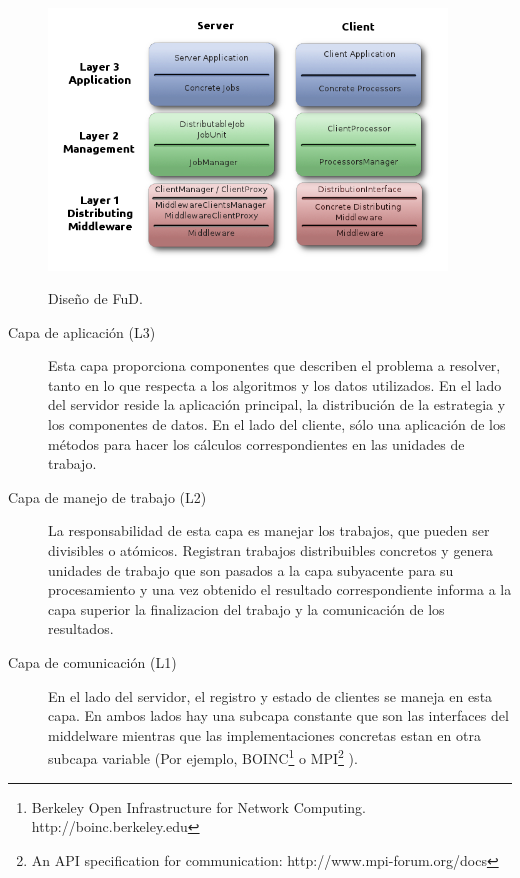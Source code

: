 \begin{figure}[!ht]
\begin{center}
\includegraphics [width=300pt]{images/FuD-AbstractLayers.png}
\label{fud_layers}
\end{center}
\caption{Diseño de FuD.}
\label{fud-layers}
\end{figure}

\begin{description}
	\item[Capa de aplicación (L3)] Esta capa proporciona componentes que describen el problema a resolver, tanto en lo que respecta a los
            algoritmos y los datos utilizados. En el lado del servidor reside la aplicación principal, la distribución de la estrategia y
            los componentes de datos. En el lado del cliente, sólo una aplicación de los métodos para hacer los cálculos correspondientes en
            las unidades de trabajo.	
	\item[Capa de manejo de trabajo (L2)] La responsabilidad de esta capa es manejar los trabajos, que pueden ser divisibles o atómicos.
            Registran trabajos distribuibles concretos y genera unidades de trabajo que son pasados a la capa subyacente para su
            procesamiento y una vez obtenido el resultado correspondiente informa a la capa superior la finalizacion del trabajo y la
            comunicación de los resultados.
	\item[Capa de comunicación (L1)] En el lado del servidor, el registro y estado de clientes se maneja en esta capa. En ambos lados hay
            una subcapa constante que son las interfaces del middelware mientras que las implementaciones concretas estan en otra subcapa
            variable (Por ejemplo, BOINC\footnote{Berkeley Open Infrastructure for Network Computing. http://boinc.berkeley.edu} o
            MPI\footnote{An API specification for communication: http://www.mpi-forum.org/docs} ).
			
\end{description}


